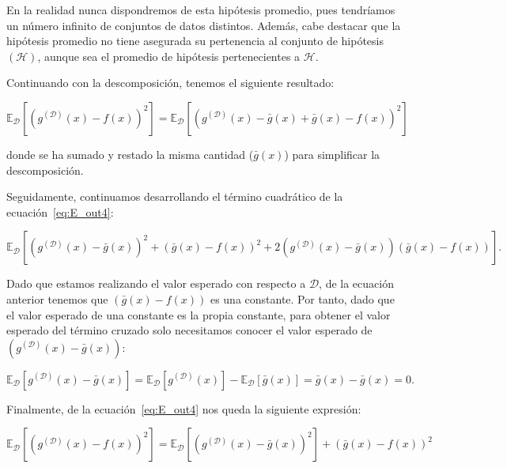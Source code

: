 En la realidad nunca dispondremos de esta hipótesis promedio, pues tendríamos un número infinito de conjuntos de datos distintos. Además, cabe destacar que la hipótesis promedio no tiene asegurada su pertenencia al conjunto de hipótesis $\mathcal{(H)}$, aunque sea el promedio de hipótesis pertenecientes a $\mathcal{H}$.\newline

Continuando con la descomposición, tenemos el siguiente resultado:

\begin{equation}\label{eq:E_out4}
    \mathbb{E}_{\mathcal{D}}[{(g^{\mathcal{(D)}}(x) - f(x))}^2] = \mathbb{E}_{\mathcal{D}}[{(g^{\mathcal{(D)}}(x) - \bar{g}(x) + \bar{g}(x) - f(x))}^2]
\end{equation}

donde se ha sumado y restado la misma cantidad ($\bar{g}(x)$) para simplificar la descomposición.\newline

Seguidamente, continuamos desarrollando el término cuadrático de la ecuación~\eqref{eq:E_out4}:

\[ \mathbb{E}_{\mathcal{D}}[{(g^{\mathcal{(D)}}(x) - \bar{g}(x))}^2 + {(\bar{g}(x) - f(x))}^2 + 2(g^{\mathcal{(D)}}(x) - \bar{g}(x))(\bar{g}(x) - f(x))]. \]\newline

Dado que estamos realizando el valor esperado con respecto a $\mathcal{D}$, de la ecuación anterior tenemos que $(\bar{g}(x) - f(x))$ es una constante. Por tanto, dado que el valor esperado de una constante es la propia constante, para obtener el valor esperado del término cruzado solo necesitamos conocer el valor esperado de $(g^{\mathcal{(D)}}(x) - \bar{g}(x))$:

\begin{equation}\label{eq:E_out6}
    \mathbb{E}_{\mathcal{D}}[g^{\mathcal{(D)}}(x) - \bar{g}(x)] = \mathbb{E}_{\mathcal{D}}[g^{\mathcal{(D)}}(x)] - \mathbb{E}_{\mathcal{D}}[\bar{g}(x)] = \bar{g}(x) - \bar{g}(x) = 0.
\end{equation}\newline

Finalmente, de la ecuación~\eqref{eq:E_out4} nos queda la siguiente expresión:

\begin{equation}\label{eq:E_out7}
    \mathbb{E}_{\mathcal{D}}[{(g^{\mathcal{(D)}}(x) - f(x))}^2] = \mathbb{E}_{\mathcal{D}}[{(g^{\mathcal{(D)}}(x) - \bar{g}(x))}^2] + {(\bar{g}(x) - f(x))}^2
\end{equation}

